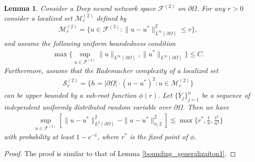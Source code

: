 \documentclass{article}
\newcommand{\F}{\mathcal{F}}
\theoremstyle{plain}
\newtheorem{lemma}[theorem]{Lemma}
\theoremstyle{definition}
\theoremstyle{remark}
\begin{document}
\begin{lemma} \label{bounding_generalization2}
   Consider a Deep neural network space $\F^{(2)}$ on $\partial \Omega$. For any $r > 0$ consider a localized set $\mathcal{M}_r^{(2)}$ defined by 
    \begin{align*}
        \mathcal{M}_r^{(2)} = \{u \in \F^{(2)}: \|u-u^*\|_{L^\infty(\partial\Omega)}^2 \leq r\},
    \end{align*}
    and assume the following uniform boundedness condition 
    \begin{align*}
        \max \{ \sup_{u \in \F^{(2)}} \| u \|_{L^\infty(\partial \Omega)}, \|u^*\|_{L^\infty(\partial\Omega)}\} \leq C.
    \end{align*}
    Furthermore, assume that the Rademacher complexity of a localized set 
    \begin{align*}
        \mathcal{S}_r^{(2)} = \{h = |\partial \Omega|\cdot( u -u^* )^2: u \in \mathcal{M}_r^{(2)}\}
    \end{align*}
    can be upper bounded by a sub-root function $\phi(r)$. Let $\{Y_j\}_{j=1}^n$ be a sequence of independent uniformly distributed random variable over $\partial \Omega$.  Then we have
    \begin{align*}
        \sup_{u \in \F^{(2)}} \left[ \|u - u^*\|_{L^2(\partial \Omega)}^2 - \|u - u^*\|_{n, 2}^2  \right]\lesssim \max\{r^*, \frac{t}{n}, \frac{t^2}{n^2}\}
    \end{align*}
    with probability at least $1 - e^{-t}$, where $r^*$ is the fixed point of $\phi$.
\end{lemma}
\begin{proof}
    The proof is similar to that of Lemma \ref{bounding_generalizaiton1}. 
\end{proof}
\end{document}
